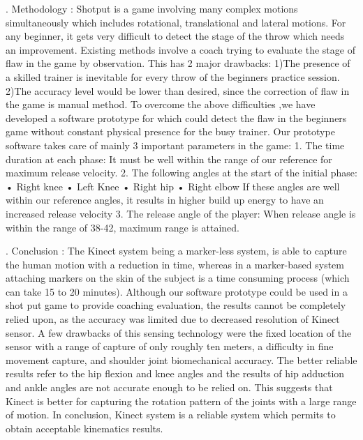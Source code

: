 . Methodology :
\noindent Shotput is a game involving many complex motions simultaneously which includes rotational, translational and lateral motions. For any beginner, it gets very difficult to detect the stage of the throw which needs an improvement. Existing methods involve a coach trying to evaluate the stage of flaw in the game by observation. This has 2 major drawbacks: 1)The presence of a skilled trainer is inevitable for every throw of the beginners practice session. 2)The accuracy level would be lower than desired, since the correction of flaw in the game is manual method. To overcome the above difficulties ,we have developed a software prototype for which could detect the flaw in the beginners game without constant physical presence for the busy trainer.
Our prototype software takes care of mainly 3 important parameters in the game:
1. The time duration at each phase:
It must be well within the range of our reference  for maximum release velocity.
2. The following angles at the start of the initial phase:
• Right knee
• Left Knee
• Right hip
• Right elbow
If these angles are well within our reference angles, it results in higher build up energy to
have an increased release velocity
3. The release angle of the player:
When release angle is within the range of 38-42, maximum range is attained.

. Conclusion :
\noindent The Kinect system being a marker-less system, is able to capture the human motion with a reduction in time, whereas in a marker-based system attaching markers on the skin of the subject is a time consuming process (which can take 15 to 20 minutes). Although our software prototype could be used in a shot put game to provide coaching
evaluation, the results cannot be completely relied upon, as the accuracy was limited due to decreased resolution of Kinect sensor. A few drawbacks of this sensing technology were the fixed location of the sensor with a range of capture of only roughly ten meters, a difficulty in fine movement capture, and shoulder joint biomechanical accuracy. The better reliable results refer to the hip flexion and knee angles and the results of hip adduction and ankle angles are not accurate enough to be relied on. This suggests that Kinect is better for capturing the rotation pattern of the joints with a large range of motion. In conclusion, Kinect system is a reliable system which permits to obtain acceptable kinematics results.


